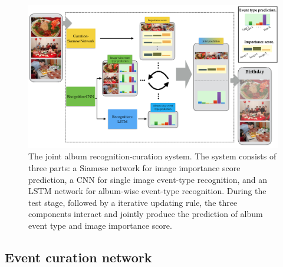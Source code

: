 \documentclass[runningheads]{llncs}
\begin{document}
\begin{figure}
\centering
\includegraphics[width=4.8in]{architecture}
\caption{The joint album recognition-curation system. The system consists of three parts: a Siamese network for image importance score prediction, a CNN for single image event-type recognition, and an LSTM network for album-wise event-type recognition. During the test stage, followed by a iterative updating rule, the three components interact and jointly produce the prediction of album event type and image importance score. }
\label{figure1}
\vspace{-0.3in}
\end{figure}

\subsection{Event curation network}
\label{curation_section}
\end{document}
